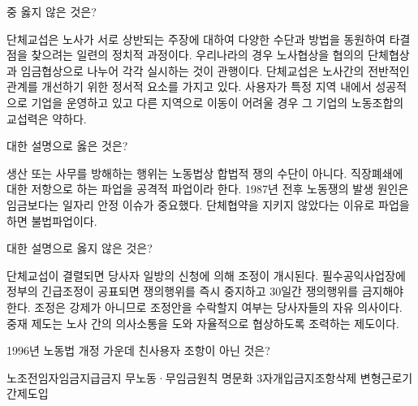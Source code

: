 \documentclass[11pt,]{exam} %
\begin{document}
\begin{questions}
 중 옳지 않은 것은?
    \begin{choices}
    \choice\relax 단체교섭은 노사가 서로 상반되는 주장에 대하여 다양한 수단과 방법을 동원하여 타결점을 찾으려는 일련의 정치적 과정이다.
    \choice\relax 우리나라의 경우 노사협상을 협의의 단체협상과 임금협상으로 나누어 각각 실시하는 것이 관행이다.
    \choice\relax 단체교섭은 노사간의 전반적인 관계를 개선하기 위한 정서적 요소를 가지고 있다.
    \CorrectChoice\relax 사용자가 특정 지역 내에서 성공적으로 기업을 운영하고 있고 다른 지역으로 이동이 어려울 경우 그 기업의 노동조합의 교섭력은 약하다.
    \end{choices}

 대한 설명으로 옳은 것은?
    \begin{choices}
    \choice\relax 생산 또는 사무를 방해하는 행위는 노동법상 합법적 쟁의 수단이 아니다.
    \choice\relax 직장폐쇄에 대한 저항으로 하는 파업을 공격적 파업이라 한다.
    \choice\relax 1987년 전후 노동쟁의 발생 원인은 임금보다는 일자리 안정 이슈가 중요했다.
    \CorrectChoice\relax 단체협약을 지키지 않았다는 이유로 파업을 하면 불법파업이다.
    \end{choices}

 대한 설명으로 옳지 않은 것은?
    \begin{choices}
    \choice\relax 단체교섭이 결렬되면 당사자 일방의 신청에 의해 조정이 개시된다.
    \choice\relax 필수공익사업장에 정부의 긴급조정이 공표되면 쟁의행위를 즉시 중지하고 30일간 쟁의행위를 금지해야 한다.
    \choice\relax 조정은 강제가 아니므로 조정안을 수락할지 여부는 당사자들의 자유 의사이다.
    \CorrectChoice\relax 중재 제도는 노사 간의 의사소통을 도와 자율적으로 협상하도록 조력하는 제도이다.
    \end{choices}


\question1996년 노동법 개정 가운데 친사용자 조항이 아닌 것은? 
    \begin{choices}
    \choice\relax 노조전임자임금지급금지   
    \choice\relax 무노동·무임금원칙 명문화 
    \CorrectChoice{}3자개입금지조항삭제
    \choice\relax 변형근로기간제도입       
    \end{choices}


\end{questions}
\end{document}
